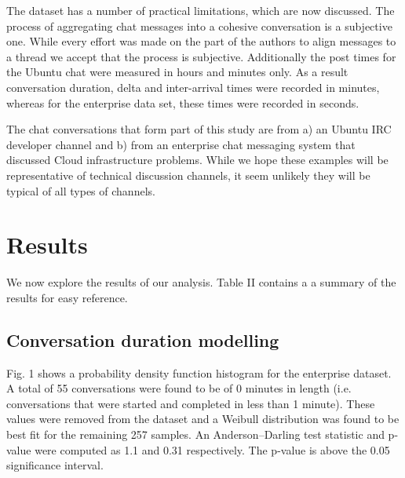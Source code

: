 \documentclass[conference]{IEEEtran}
\begin{document}
The dataset has a number of practical limitations, which are now discussed. The process of aggregating chat messages into a cohesive conversation is a subjective one. While every effort was made on the part of the authors to align messages to a thread we accept that the process is subjective. Additionally the post times for the Ubuntu chat were measured in hours and minutes only. As a result conversation duration, delta and inter-arrival times were recorded in minutes, whereas for the enterprise data set, these times were recorded in seconds. \par

The chat conversations that form part of this study are from a) an Ubuntu IRC developer channel and b) from an enterprise chat messaging system that discussed Cloud infrastructure problems. While we hope these examples will be representative of technical discussion channels, it seem unlikely they will be typical of all types of channels. \par

\section{Results}

We now explore the results of our analysis. Table II contains a a summary of the results for easy reference.

\subsection{Conversation duration modelling}

Fig. 1 shows a probability density function histogram for the enterprise dataset. A total of 55 conversations were found to be of 0 minutes in length (i.e. conversations that were started and completed in less than 1 minute). These values were removed from the dataset and a Weibull distribution was found to be best fit for the remaining 257 samples. An Anderson--Darling test statistic and p-value were computed as 1.1 and 0.31 respectively. The p-value is above the 0.05 significance interval. 
\end{document}
